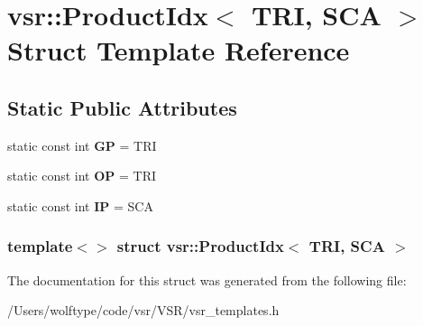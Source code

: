 \hypertarget{structvsr_1_1_product_idx_3_01_t_r_i_00_01_s_c_a_01_4}{\section{vsr\-:\-:Product\-Idx$<$ T\-R\-I, S\-C\-A $>$ Struct Template Reference}
\label{structvsr_1_1_product_idx_3_01_t_r_i_00_01_s_c_a_01_4}
}
\subsection*{Static Public Attributes}
\begin{DoxyCompactItemize}
\item 
\hypertarget{structvsr_1_1_product_idx_3_01_t_r_i_00_01_s_c_a_01_4_af69ba94af9fab0d51249363184d41ec3}{static const int {\bfseries G\-P} = T\-R\-I}\label{structvsr_1_1_product_idx_3_01_t_r_i_00_01_s_c_a_01_4_af69ba94af9fab0d51249363184d41ec3}

\item 
\hypertarget{structvsr_1_1_product_idx_3_01_t_r_i_00_01_s_c_a_01_4_a3e90b964b2fe1d5fd6b6dfb1b6e4b65b}{static const int {\bfseries O\-P} = T\-R\-I}\label{structvsr_1_1_product_idx_3_01_t_r_i_00_01_s_c_a_01_4_a3e90b964b2fe1d5fd6b6dfb1b6e4b65b}

\item 
\hypertarget{structvsr_1_1_product_idx_3_01_t_r_i_00_01_s_c_a_01_4_a1e0f259340c2b8f631d817e69c795fba}{static const int {\bfseries I\-P} = S\-C\-A}\label{structvsr_1_1_product_idx_3_01_t_r_i_00_01_s_c_a_01_4_a1e0f259340c2b8f631d817e69c795fba}

\end{DoxyCompactItemize}
\subsubsection*{template$<$$>$ struct vsr\-::\-Product\-Idx$<$ T\-R\-I, S\-C\-A $>$}



The documentation for this struct was generated from the following file\-:\begin{DoxyCompactItemize}
\item 
/\-Users/wolftype/code/vsr/\-V\-S\-R/vsr\-\_\-templates.\-h\end{DoxyCompactItemize}

